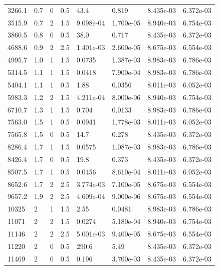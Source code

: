 \documentclass[preview]{standalone}
\begin{document}
{{\begin{tabular}{L{1.2cm}C{1.2cm} C{0.3cm}C{0.5cm} C{1.4cm}C{1.4cm} C{1.4cm}C{1.4cm}}
  3266.1  &   0.7  & 0     & 0.5 &  43.4  & 0.819  & 8.435e-03 &  6.372e-03   \\ 
  3515.9  &   0.7  & 2     & 1.5 &  9.098e-04  & 1.700e-05  & 8.940e-03 &  6.754e-03   \\ 
  3860.5  &   0.8  & 0     & 0.5 &  38.0  & 0.717  & 8.435e-03 &  6.372e-03   \\ 
  4688.6  &   0.9  & 2     & 2.5 &  1.401e-03  & 2.600e-05  & 8.675e-03 &  6.554e-03   \\ 
  4995.7  &   1.0  & 1     & 1.5 &  0.0735  & 1.387e-03  & 8.983e-03 &  6.786e-03   \\ 
  5314.5  &   1.1  & 1     & 1.5 &  0.0418  & 7.900e-04  & 8.983e-03 &  6.786e-03   \\ 
  5404.1  &   1.1  & 1     & 0.5 &  1.88  & 0.0356  & 8.011e-03 &  6.052e-03   \\ 
  5983.3  &   1.2  & 2     & 1.5 &  4.211e-04  & 8.000e-06  & 8.940e-03 &  6.754e-03   \\ 
  6710.7  &   1.3  & 1     & 1.5 &  0.704  & 0.0133  & 8.983e-03 &  6.786e-03   \\ 
  7563.0  &   1.5  & 1     & 0.5 &  0.0941  & 1.778e-03  & 8.011e-03 &  6.052e-03   \\ 
  7565.8  &   1.5  & 0     & 0.5 &  14.7  & 0.278  & 8.435e-03 &  6.372e-03   \\ 
  8286.4  &   1.7  & 1     & 1.5 &  0.0575  & 1.087e-03  & 8.983e-03 &  6.786e-03   \\ 
  8426.4  &   1.7  & 0     & 0.5 &  19.8  & 0.373  & 8.435e-03 &  6.372e-03   \\ 
  8507.5  &   1.7  & 1     & 0.5 &  0.0456  & 8.610e-04  & 8.011e-03 &  6.052e-03   \\ 
  8652.6  &   1.7  & 2     & 2.5 &  3.774e-03  & 7.100e-05  & 8.675e-03 &  6.554e-03   \\ 
  9657.2  &   1.9  & 2     & 2.5 &  4.609e-04  & 9.000e-06  & 8.675e-03 &  6.554e-03   \\ 
  10325  &     2  & 1     & 1.5 &  2.55  & 0.0481  & 8.983e-03 &  6.786e-03   \\ 
  11071  &     2  & 2     & 1.5 &  0.0274  & 5.180e-04  & 8.940e-03 &  6.754e-03   \\ 
  11146  &     2  & 2     & 2.5 &  5.001e-03  & 9.400e-05  & 8.675e-03 &  6.554e-03   \\ 
  11220  &     2  & 0     & 0.5 &  290.6  & 5.49  & 8.435e-03 &  6.372e-03   \\ 
  11469  &     2  & 0     & 0.5 &  0.196  & 3.700e-03  & 8.435e-03 &  6.372e-03   \\ 

\end{tabular}}}
\end{document}
